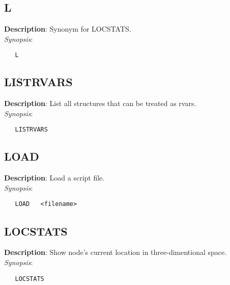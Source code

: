 \subsection{\bf L}
\label{manpages:L}
\label{manpages:l}
\vspace{-0.2in}
{\bf Description}: 	Synonym for LOCSTATS.\\[1.5ex]
{\em Synopsis}:
\vspace{-0.2in}
\scriptsize
\begin{verbatim}
   L   						
\end{verbatim}
\normalsize
\vspace{-0.2in}


\subsection{\bf LISTRVARS}
\label{manpages:LISTRVARS}
\label{manpages:listrvars}
\vspace{-0.2in}
{\bf Description}: 	List all structures that can be treated as rvars.\\[1.5ex]
{\em Synopsis}:
\vspace{-0.2in}
\scriptsize
\begin{verbatim}
   LISTRVARS   		
\end{verbatim}
\normalsize
\vspace{-0.2in}


\subsection{\bf LOAD}
\label{manpages:LOAD}
\label{manpages:load}
\vspace{-0.2in}
{\bf Description}: 	Load a script file.\\[1.5ex]
{\em Synopsis}:
\vspace{-0.2in}
\scriptsize
\begin{verbatim}
   LOAD   <filename>						
\end{verbatim}
\normalsize
\vspace{-0.2in}


\subsection{\bf LOCSTATS}
\label{manpages:LOCSTATS}
\label{manpages:locstats}
\vspace{-0.2in}
{\bf Description}: 	Show node's current location in three-dimentional space.\\[1.5ex]
{\em Synopsis}:
\vspace{-0.2in}
\scriptsize
\begin{verbatim}
   LOCSTATS   		
\end{verbatim}
\normalsize
\vspace{-0.2in}


